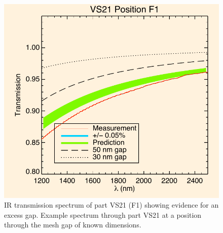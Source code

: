 \documentclass[osajnl,preprint,showpacs,superscriptaddress,12pt]{revtex4-1} %
\begin{document}
\begin{figure}[htbp]
\centerline{\includegraphics[width=.8\columnwidth]{figs/20130911_VS21posF1}}
\caption{IR transmission spectrum of part VS21 (F1) showing evidence for an excess gap\label{VS21specf1}.  Example spectrum through part VS21 at a position through the mesh gap of known dimensions.}
\end{figure}
\end{document}

